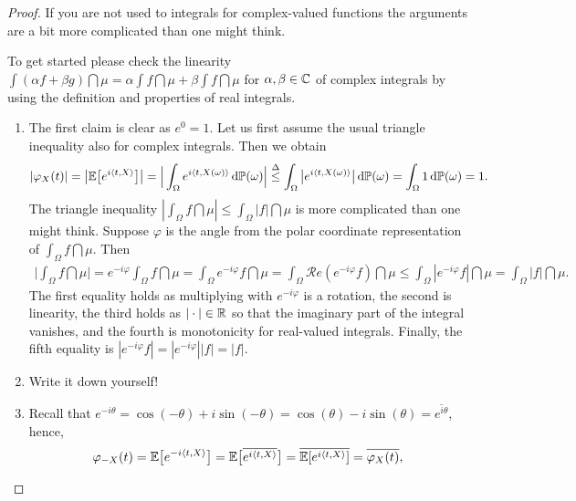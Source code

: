 \begin{proof}[Proof]
	If you are not used to integrals for complex-valued functions the arguments are a bit more complicated than one might think.
	\begin{luebung}
		To get started please check the linearity $\int (\alpha f+\beta g)\dint \mu=\alpha \int f \dint \mu+\beta \int f \dint \mu$ for $\alpha, \beta \in\mathbb{C}$ of complex integrals by using the definition and properties of real integrals.
	\end{luebung}
	\begin{enumerate}[label=(\roman*)]
		\item The first claim is clear as $e^0=1$. Let us first assume the usual triangle inequality also for complex integrals. Then we obtain
			\begin{align*}
				\lvert \varphi_X(t) \rvert 
				= \big| \mathbb{E} \big[ e^{i \langle t,X \rangle} \big] \big| 
				= \Big| \int_{\Omega} e^{i \langle t, X(\omega) \rangle} \, \mathrm{d} \mathbb{P}(\omega) \Big|
				\overset{\Delta}{\leq} \int_{\Omega} \big| e^{i \langle t, X(\omega) \rangle} \big| \, \mathrm{d} \mathbb{P}(\omega)
				= \int_\Omega 1\, \mathrm{d} \mathbb P(\omega) = 1.
			\end{align*}
			The triangle inequality $|\int_\Omega f\dint \mu|\leq \int_\Omega |f|\dint \mu$ is more complicated than one might think. Suppose $\varphi$ is the angle from the polar coordinate representation of $\int_\Omega f\dint \mu$. Then
			\begin{align*}
				\Big|\int_\Omega f \dint \mu \Big| = e^{-i\varphi} \int_\Omega f \dint \mu
				=\int_\Omega e^{-i\varphi} f \dint \mu
				=\int_\Omega \mathcal{R}e(e^{-i\varphi} f) \dint \mu
				\leq \int_\Omega |e^{-i\varphi} f| \dint \mu
				= \int_\Omega  |f| \dint \mu.
			\end{align*}
			The first equality holds as multiplying with $e^{-i\varphi}$ is a rotation, the second is linearity, the third holds as $|\cdot|\in \mathbb{R}$ so that the imaginary part of the integral vanishes, and the fourth is monotonicity for real-valued integrals. Finally, the fifth equality is $|e^{-i\varphi}f|=|e^{-i\varphi}||f|=|f|$.
		\item
			Write it down yourself!
		\item Recall that
			$e^{-i\theta} = \cos(-\theta) + i \sin(-\theta) = \cos(\theta) - i \sin(\theta) = \overline{e^{i \theta}}$, hence, 
			\begin{align*}
				\varphi_{-X}(t) = \E \big[ e^{-i \langle t, X \rangle} \big] = \E \big[ \overline{ e^{i \langle t, X \rangle}} \big] = \overline{\E [ e^{i \langle t, X \rangle}]} = \overline{\varphi_X(t)},

\end{align*}
\end{enumerate}
\end{proof}
